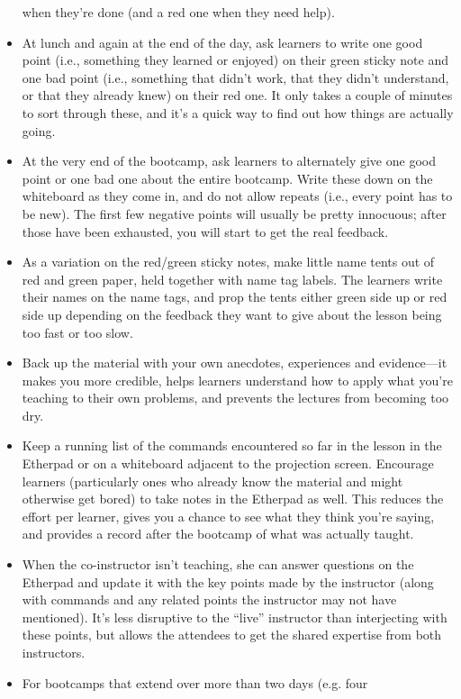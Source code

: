 \documentclass[]{book}
\begin{document}
\begin{itemize}
  when they're done (and a red one when they need help).
\item
  At lunch and again at the end of the day, ask learners to write one
  good point (i.e., something they learned or enjoyed) on their green
  sticky note and one bad point (i.e., something that didn't work, that
  they didn't understand, or that they already knew) on their red one.
  It only takes a couple of minutes to sort through these, and it's a
  quick way to find out how things are actually going.
\item
  At the very end of the bootcamp, ask learners to alternately give one
  good point or one bad one about the entire bootcamp. Write these down
  on the whiteboard as they come in, and do not allow repeats (i.e.,
  every point has to be new). The first few negative points will usually
  be pretty innocuous; after those have been exhausted, you will start
  to get the real feedback.
\item
  As a variation on the red/green sticky notes, make little name tents
  out of red and green paper, held together with name tag labels. The
  learners write their names on the name tags, and prop the tents either
  green side up or red side up depending on the feedback they want to
  give about the lesson being too fast or too slow.
\item
  Back up the material with your own anecdotes, experiences and
  evidence---it makes you more credible, helps learners understand how
  to apply what you're teaching to their own problems, and prevents the
  lectures from becoming too dry.
\item
  Keep a running list of the commands encountered so far in the lesson
  in the Etherpad or on a whiteboard adjacent to the projection screen.
  Encourage learners (particularly ones who already know the material
  and might otherwise get bored) to take notes in the Etherpad as well.
  This reduces the effort per learner, gives you a chance to see what
  they think you're saying, and provides a record after the bootcamp of
  what was actually taught.
\item
  When the co-instructor isn't teaching, she can answer questions on the
  Etherpad and update it with the key points made by the instructor
  (along with commands and any related points the instructor may not
  have mentioned). It's less disruptive to the ``live'' instructor than
  interjecting with these points, but allows the attendees to get the
  shared expertise from both instructors.
\item
  For bootcamps that extend over more than two days (e.g. four

\end{itemize}
\end{document}
